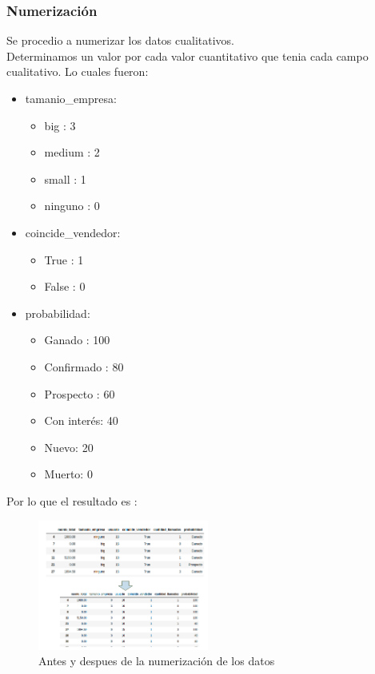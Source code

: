 \documentclass[conference]{IEEEtran}
\begin{document}
\subsubsection{Numerización}
Se procedio a numerizar los datos cualitativos. \\
Determinamos un valor por cada valor cuantitativo que tenia cada campo cualitativo. Lo cuales fueron:
\begin{itemize}
    \item tamanio\_empresa:
    \begin{itemize}
        \item big : 3
        \item medium : 2
        \item small : 1
        \item ninguno : 0
    \end{itemize}
    \item coincide\_vendedor:
    \begin{itemize}
        \item True : 1
        \item False : 0
    \end{itemize}
    \item probabilidad:
    \begin{itemize}
        \item Ganado : 100
        \item Confirmado : 80
        \item Prospecto : 60
        \item Con interés: 40
        \item Nuevo: 20
        \item Muerto: 0
    \end{itemize}
\end{itemize}
Por lo que el resultado es : 
\begin{figure}[H]
    \centering
    \includegraphics[width=0.5\textwidth]{preprocesamiento/antes_despues_numerizacion}
    \caption{Antes y despues de la numerización de los datos}
    \label{fig:antes_despues_numerizacion}
\end{figure}
\end{document}
